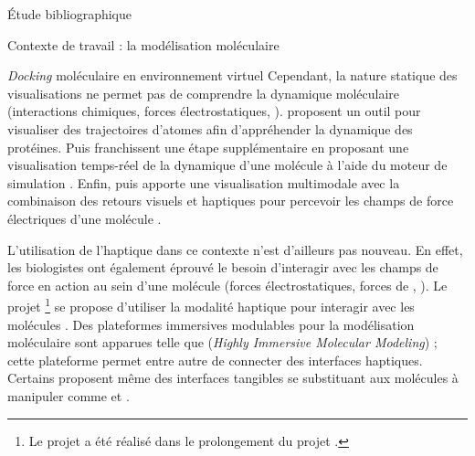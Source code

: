 \documentclass[myfrancais,ngerman,english,french]{mythesis}
\begin{document}
\begin{mychapter}{Étude bibliographique}
\begin{mysection}{Contexte de travail : la modélisation moléculaire}
\begin{mysubsection}{\textit{Docking} moléculaire en environnement virtuel}
				Cependant, la nature statique des visualisations ne permet pas de comprendre la dynamique moléculaire (interactions chimiques, forces électrostatiques, \myetc).
				 proposent un outil pour visualiser des trajectoires d'atomes afin d'appréhender la dynamique des protéines.
				Puis  franchissent une étape supplémentaire en proposant une visualisation temps-réel de la dynamique d'une molécule à l'aide du moteur de simulation \myGromacs {}.
				Enfin,  puis  apporte une visualisation multimodale avec la combinaison des retours visuels et haptiques pour percevoir les champs de force électriques d'une molécule .

				\begin{myfigure}
				\end{myfigure}

				L'utilisation de l'haptique dans ce contexte n'est d'ailleurs pas nouveau.
				En effet, les biologistes ont également éprouvé le besoin d'interagir avec les champs de force en action au sein d'une molécule (forces électrostatiques, forces de , \myetc).
				Le projet \myGROPEHaptic\footnote{Le projet \myGROPEHaptic a été réalisé dans le prolongement du projet \myGROPE.} se propose d'utiliser la modalité haptique pour interagir avec les molécules .
				Des plateformes immersives modulables pour la modélisation moléculaire sont apparues telle que \myHIMM (\textit{Highly Immersive Molecular Modeling}) ; cette plateforme permet entre autre de connecter des interfaces haptiques.
				Certains proposent même des interfaces tangibles se substituant aux molécules à manipuler comme  et .


\end{mysubsection}
\end{mysection}
\end{mychapter}
\end{document}
